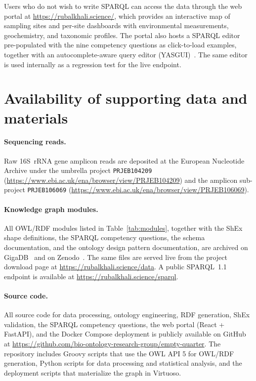 \documentclass[11pt,a4paper]{article}
\begin{document}
Users who do not wish to write SPARQL can access the data through the
web portal at \url{https://rubalkhali.science/}, which provides an
interactive map of sampling sites and per-site dashboards with
environmental measurements, geochemistry, and taxonomic profiles. The
portal also hosts a SPARQL editor pre-populated with the nine
competency questions as click-to-load examples, together with an
autocomplete-aware query editor (YASGUI)~\cite{yasgui}. The same
editor is used internally as a regression test for the live endpoint.

\section{Availability of supporting data and materials}

\paragraph{Sequencing reads.}
Raw 16S~rRNA gene amplicon reads are deposited at the European
Nucleotide Archive under the umbrella project \texttt{PRJEB104209}
(\url{https://www.ebi.ac.uk/ena/browser/view/PRJEB104209}) and the
amplicon sub-project \texttt{PRJEB106069}
(\url{https://www.ebi.ac.uk/ena/browser/view/PRJEB106069}).

\paragraph{Knowledge graph modules.}
All OWL/RDF modules listed in Table~\ref{tab:modules}, together with
the ShEx shape definitions, the SPARQL competency questions, the
schema documentation, and the ontology design pattern documentation,
are archived on GigaDB~\cite{gigadb_rak} and on
Zenodo~\cite{zenodo_rak}. The same files are served live from the
project download page at
\url{https://rubalkhali.science/data}. A public SPARQL~1.1 endpoint
is available at \url{https://rubalkhali.science/sparql}.

\paragraph{Source code.}
All source code for data processing, ontology engineering, RDF
generation, ShEx validation, the SPARQL competency questions, the
web portal (React + FastAPI), and the Docker Compose deployment is
publicly available on GitHub at
\url{https://github.com/bio-ontology-research-group/empty-quarter}. The
repository includes Groovy scripts that use the OWL API 5 for
OWL/RDF generation, Python scripts for data processing and
statistical analysis, and the deployment scripts that materialize the
graph in Virtuoso.
\end{document}
